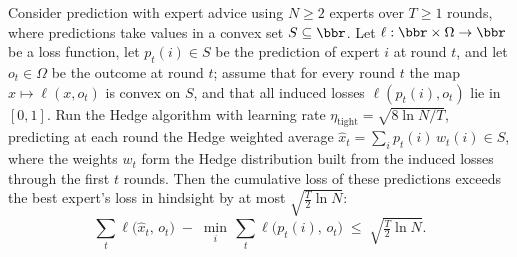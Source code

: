 \begin{theorem}
\label{hedgePrediction_regret_tight_optimal}
\leanok
{}
Consider prediction with expert advice using $N \ge 2$ experts over $T \ge 1$ rounds,
where predictions take values in a convex set $S \subseteq \bbr$. Let $\ell : \bbr
\times \Omega \to \bbr$ be a loss function, let $p_t(i) \in S$ be the prediction of
expert $i$ at round $t$, and let $o_t \in \Omega$ be the outcome at round $t$; assume
that for every round $t$ the map $x \mapsto \ell(x, o_t)$ is convex on $S$, and that all
induced losses $\ell(p_t(i), o_t)$ lie in $[0,1]$. Run the Hedge algorithm with learning
rate $\eta_{\mathrm{tight}} = \sqrt{8\ln N / T}$, predicting at each round the Hedge
weighted average $\widehat{x}_t = \sum_i p_t(i)\, w_{t}(i) \in S$, where the weights
$w_t$ form the Hedge distribution built from the induced losses through the first $t$
rounds. Then the cumulative loss of these predictions exceeds the best expert's loss in
hindsight by at most $\sqrt{\tfrac{T}{2}\ln N}$:
\[
\sum_{t} \ell\bigl(\widehat{x}_t,\, o_t\bigr) \;-\; \min_{i}\, \sum_{t}
\ell\bigl(p_t(i),\, o_t\bigr)
  \;\le\; \sqrt{\tfrac{T}{2}\ln N}.
\]
\end{theorem}
